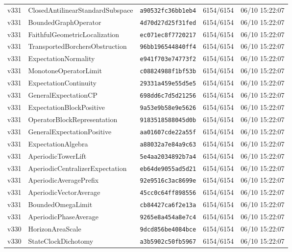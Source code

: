 \documentclass[11pt]{article}
\theoremstyle{definition}\newtheorem{deriv}{Derivation}
\begin{document}
{\begin{longtable}{@{}lllll@{}}
v331 & ClosedAntilinearStandardSubspace & \texttt{a90532fc36bb1eb4} & 6154/6154 & 06/10 15:22:07 \\
v331 & BoundedGraphOperator & \texttt{4d70d27d25f31fed} & 6154/6154 & 06/10 15:22:07 \\
v331 & FaithfulGeometricLocalization & \texttt{ec071ec8f7720217} & 6154/6154 & 06/10 15:22:07 \\
v331 & TransportedBorchersObstruction & \texttt{96bb196544840ff4} & 6154/6154 & 06/10 15:22:07 \\
v331 & ExpectationNormality & \texttt{e941f703e74773f2} & 6154/6154 & 06/10 15:22:07 \\
v331 & MonotoneOperatorLimit & \texttt{c08824988f1bf53b} & 6154/6154 & 06/10 15:22:07 \\
v331 & ExpectationContinuity & \texttt{29331a459e55d5e5} & 6154/6154 & 06/10 15:22:07 \\
v331 & GeneralExpectationCP & \texttt{698dd6c7d5d21256} & 6154/6154 & 06/10 15:22:07 \\
v331 & ExpectationBlockPositive & \texttt{9a53e9b58e9e5626} & 6154/6154 & 06/10 15:22:07 \\
v331 & OperatorBlockRepresentation & \texttt{9183518588045d0b} & 6154/6154 & 06/10 15:22:07 \\
v331 & GeneralExpectationPositive & \texttt{aa01607cde22a55f} & 6154/6154 & 06/10 15:22:07 \\
v331 & ExpectationAlgebra & \texttt{a88032a7e84a9c63} & 6154/6154 & 06/10 15:22:07 \\
v331 & AperiodicTowerLift & \texttt{5e4aa2034892b7a4} & 6154/6154 & 06/10 15:22:07 \\
v331 & AperiodicCentralizerExpectation & \texttt{eb64de9055ad5d21} & 6154/6154 & 06/10 15:22:07 \\
v331 & AperiodicAveragePrefix & \texttt{92e9516c3ac8699e} & 6154/6154 & 06/10 15:22:07 \\
v331 & AperiodicVectorAverage & \texttt{45cc0c64ff898556} & 6154/6154 & 06/10 15:22:07 \\
v331 & BoundedOmegaLimit & \texttt{cb84427ca6f2e13a} & 6154/6154 & 06/10 15:22:07 \\
v331 & AperiodicPhaseAverage & \texttt{9265e8a454a8e7c4} & 6154/6154 & 06/10 15:22:07 \\
v330 & HorizonAreaScale & \texttt{9dcd856be4084bce} & 6154/6154 & 06/10 15:22:07 \\
v330 & StateClockDichotomy & \texttt{a3b5902c50fb5967} & 6154/6154 & 06/10 15:22:07 \\

\end{longtable}}
\end{document}
